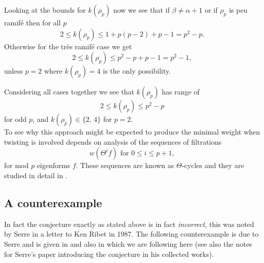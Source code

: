 \documentclass[a4paper,12pt]{article}
\begin{document}
Looking at the bounds for $k(\rho_p)$ now we see that if $\beta \ne \alpha + 1$ or if $\rho_p$ is peu ramif\'e then for all $p$
\[
2\le k(\rho_p) \le 1 + p(p-2) + p - 1 = p^2 - p.
\]
Otherwise for the tr\`es ramif\'e case we get
\[
2\le k(\rho_p) \le p^2 - p + p -1 = p^2 - 1,
\]
unless $p =2$ where $k(\rho_p) = 4$ is the only possibility.

Considering all cases together we see that $k(\rho_p)$ has range of
\[
2\le k(\rho_p) \le p^2 - p
\]
for odd $p$, and $k(\rho_p) \in\{2,\,4\}$ for $p=2$.
\\[12pt] \noindent
To see why this approach might be expected to produce the minimal weight when twisting is involved depends on analysis of the sequences of filtrations
\[
w(\Theta^i f) \text{ for } 0 \le i \le p + 1,
\]
for mod $p$ eigenforms $f$.
These sequences are known as $\Theta$-cycles and they are studied in detail in \cite{Jochnowitz}.


\subsection{A counterexample}\label{subsec:counter}
In fact the conjecture exactly as stated above is in fact \emph{incorrect}, this was noted by Serre in a letter to Ken Ribet in 1987.
The following counterexample is due to Serre and is given in \cite[sec. 2]{Ribet95} and also in \cite[sec. 21.6.1]{RibetSteinBook} which we are following here (see also the notes for Serre's paper introducing the conjecture in his collected works).
\end{document}

